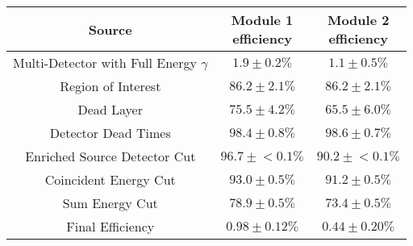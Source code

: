 \begin{tabular}{|c|c|c|}
\hline
  Source & \makecell{Module 1\\efficiency} & \makecell{Module 2\\efficiency} \\
\hline
  \makecell{Multi-Detector with\\Full Energy $\gamma$} & $1.9 \pm 0.2\%$ & $1.1 \pm 0.5\%$ \\
  Region of Interest & $86.2 \pm 2.1\%$ & $86.2 \pm 2.1\%$ \\
  Dead Layer & $75.5 \pm 4.2\%$ & $65.5 \pm 6.0\%$ \\
  Detector Dead Times & $98.4 \pm 0.8\%$ & $98.6 \pm 0.7\%$ \\
  Enriched Source Detector Cut & $96.7 \pm{}<\!0.1\%$ & $90.2 \pm{}<\!0.1\%$ \\
  Coincident Energy Cut & $93.0 \pm 0.5\%$ & $91.2 \pm 0.5\%$ \\
  Sum Energy Cut & $78.9 \pm 0.5\%$ & $73.4 \pm 0.5\%$ \\
  \hline Final Efficiency & $0.98 \pm 0.12\%$ & $0.44 \pm 0.20\%$ \\
\hline
\end{tabular}
